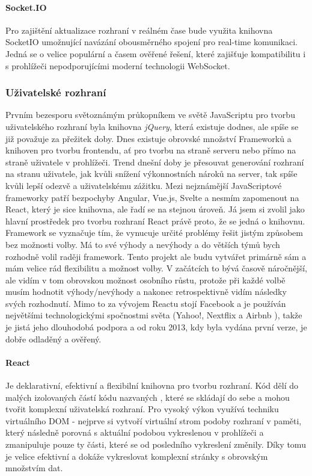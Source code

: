 \paragraph{Socket.IO}\label{socketio} Pro zajištění aktualizace rozhraní v reálném čase bude využita knihovna SocketIO umožnující navázání obousměrného spojení pro real-time komunikaci. Jedná se o velice populární a časem ověřené řešení, které zajišťuje kompatibilitu i s prohlížeči nepodporujícími moderní technologii WebSocket.


\subsubsection{Uživatelské rozhraní}
Prvním bezesporu světoznámým průkopníkem ve světě JavaScriptu pro tvorbu uživatelského rozhraní byla knihovna \textit{jQuery}, která existuje dodnes, ale spíše se již považuje za přežitek doby. Dnes existuje obrovské množství Frameworků a knihoven pro tvorbu frontendu, ať pro tvorbu na straně serveru nebo přímo na straně uživatele v prohlížeči. Trend dnešní doby je přesouvat generování rozhraní na stranu uživatele, jak kvůli snížení výkonnostních nároků na server, tak spíše kvůli lepší odezvě a uživatelskému zážitku. Mezi nejznámější JavaScriptové frameworky patří bezpochyby Angular, Vue.js, Svelte a nesmím zapomenout na React, který je sice knihovna, ale řadí se na stejnou úroveň. Já jsem si zvolil jako hlavní prostředek pro tvorbu rozhraní React právě proto, že se jedná o knihovnu. Framework se vyznačuje tím, že vynucuje určité problémy řešit jistým způsobem bez možnosti volby. Má to své výhody a nevýhody a do větších týmů bych rozhodně volil raději framework. Tento projekt ale budu vytvářet primárně sám a mám velice rád flexibilitu a možnost volby. V začátcích to bývá časově náročnější, ale vidím v tom obrovskou možnost osobního růstu, protože při každé volbě musím hodnotit výhody/nevýhody a nakonec retrospektivně vidím následky svých rozhodnutí. Mimo to za vývojem Reactu stojí Facebook a je používán největšími technologickými spočnostmi světa (Yahoo!, Nextflix a Airbnb \cite{react-companies}), takže je jistá jeho dlouhodobá podpora a od roku 2013, kdy byla vydána první verze, je dobře odladěný a ověřený.

\paragraph{React} Je deklarativní, efektivní a flexibilní knihovna pro tvorbu rozhraní. Kód dělí do malých izolovaných částí kódu nazvaných , které se skládají do sebe a mohou tvořit komplexní uživatelská rozhraní. Pro vysoký výkon využívá techniku virtuálního DOM - nejprve si vytvoří virtuální strom podoby rozhraní v paměti, který následně porovná s aktuální podobou vykreslenou v prohlížeči a zmanipuluje pouze ty části, které se od posledního vykreslení změnily. Díky tomu je velice efektivní a dokáže vykreslovat komplexní stránky s obrovským množstvím dat. \cite{react}